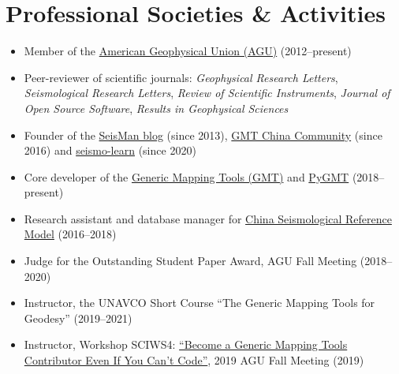 \section{Professional Societies \& Activities}

\begin{itemize}
\item Member of the \href{https://sites.agu.org/}{American Geophysical Union (AGU)} (2012--present)
\item Peer-reviewer of scientific journals:
      \textit{Geophysical Research Letters},
      \textit{Seismological Research Letters},
      \textit{Review of Scientific Instruments},
      \textit{Journal of Open Source Software},
      \textit{Results in Geophysical Sciences}
\item Founder of the \href{https://blog.seisman.info}{SeisMan blog} (since 2013),
      \href{http://gmt-china.org/}{GMT China Community} (since 2016)
      and \href{https://seismo-learn.org/}{seismo-learn} (since 2020)
\item Core developer of the \href{https://github.com/GenericMappingTools/gmt}{Generic Mapping Tools (GMT)} and \href{https://github.com/GenericMappingTools/pygmt}{PyGMT} (2018--present)
\item Research assistant and database manager for \href{http://chinageorefmodel.org/}{China Seismological Reference Model} (2016--2018)
\item Judge for the Outstanding Student Paper Award, AGU Fall Meeting (2018--2020)
\item Instructor, the UNAVCO Short Course ``The Generic Mapping Tools for Geodesy'' (2019--2021)
\item Instructor, Workshop SCIWS4: \href{https://www.agu.org/Events/SCIWS4-Generic-Mapping-Tools}{``Become a Generic Mapping Tools Contributor Even If You Can't Code''}, 2019 AGU Fall Meeting (2019)
\end{itemize}
